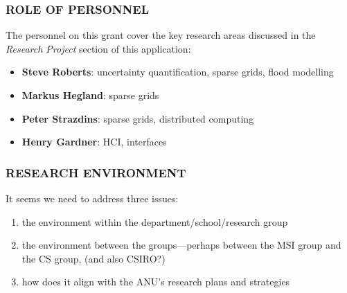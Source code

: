 \documentclass[a4paper,fontsize=12pt]{scrartcl}
\begin{document}
\subsubsection*{ROLE OF PERSONNEL}

The personnel on this grant cover the key research areas discussed in
the \emph{Research Project} section of this application:

\begin{itemize}
\item \textbf{Steve Roberts}: uncertainty quantification, sparse grids, flood
  modelling
\item \textbf{Markus Hegland}: sparse grids
\item \textbf{Peter Strazdins}: sparse grids, distributed computing
\item \textbf{Henry Gardner}: HCI, interfaces
\end{itemize}

\subsubsection*{RESEARCH ENVIRONMENT}


It seems we need to address three issues: 

\begin{enumerate}
\item the environment within the department/school/research group
\item the environment between the groups---perhaps between the MSI
  group and the CS group, (and also CSIRO?)
\item how does it align with the ANU's research plans and strategies
\end{enumerate}
\end{document}
